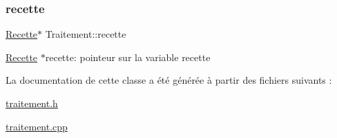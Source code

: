 \subsubsection{\texorpdfstring{recette}{recette}}
{\footnotesize\ttfamily \hyperlink{classRecette}{Recette}$\ast$ Traitement\+::recette\hspace{0.3cm}{\ttfamily [private]}}

\hyperlink{classRecette}{Recette} $\ast$recette\+: pointeur sur la variable recette 

La documentation de cette classe a été générée à partir des fichiers suivants \+:\begin{DoxyCompactItemize}
\item 
\hyperlink{traitement_8h}{traitement.\+h}\item 
\hyperlink{traitement_8cpp}{traitement.\+cpp}\end{DoxyCompactItemize}
